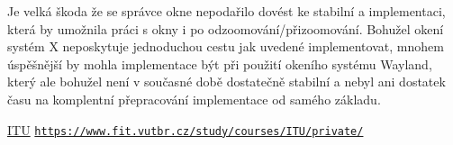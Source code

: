 \documentclass[12pt,a4paper,titlepage,final]{article}
\begin{document}
Je velká škoda že se správce okne nepodařilo dovést ke stabilní a implementaci, která by umožnila práci s okny
i po odzoomování/přizoomování. Bohužel okení systém X neposkytuje jednoduchou cestu jak uvedené implementovat,
mnohem úspěšnější by mohla implementace být při použití okeního systému Wayland, který ale bohužel není v současné
době dostatečně stabilní a nebyl ani dostatek času na komplentní přepracování implementace od samého základu.

\begin{thebibliography}{1}

\href{https://www.fit.vutbr.cz/study/courses/ITU/private/}{ITU} \newline
\href{https://www.fit.vutbr.cz/study/courses/ITU/private/}{\nolinkurl{https://www.fit.vutbr.cz/study/courses/ITU/private/}}

\end{thebibliography}

\end{document}
